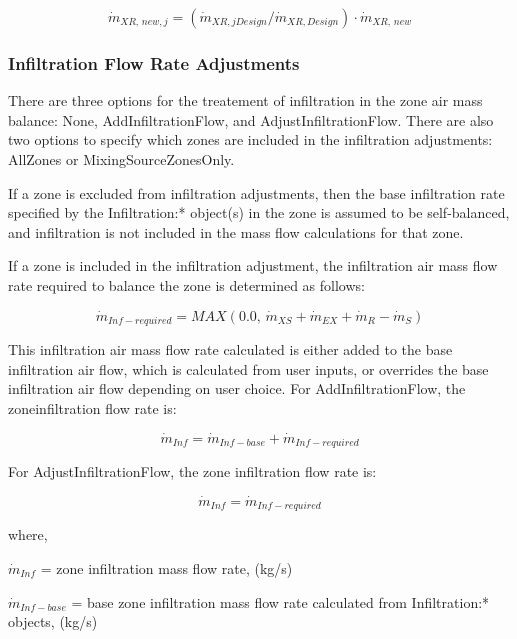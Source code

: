 \begin{equation}
{\dot m_{XR,\,new,j}} = \left( {{{\dot m}_{XR,jDesign}}/{{\dot m}_{XR,Design}}} \right) \cdot {\dot m_{XR,\,new}}
\end{equation}

\subsubsection{Infiltration Flow Rate Adjustments}\label{infiltration-flow-rate-adjustments}

There are three options for the treatement of infiltration in the zone air mass balance: None, AddInfiltrationFlow, and AdjustInfiltrationFlow. There are also two options to specify which zones are included in the infiltration adjustments: AllZones or MixingSourceZonesOnly.

If a zone is excluded from infiltration adjustments, then the base infiltration rate specified by the Infiltration:* object(s) in the zone is assumed to be self-balanced, and infiltration is not included in the mass flow calculations for that zone.

If a zone is included in the infiltration adjustment, the infiltration air mass flow rate required to balance the zone is determined as follows:

\begin{equation}
{\dot m_{Inf-required}} = MAX\left( {0.0,\,{{\dot m}_{XS}} + {{\dot m}_{EX}} + {{\dot m}_{R}} - {{\dot m}_S}} \right)
\end{equation}

This infiltration air mass flow rate calculated is either added to the base infiltration air flow, which is calculated from user inputs, or overrides the base infiltration air flow depending on user choice. For AddInfiltrationFlow, the zoneinfiltration flow rate is:

\begin{equation}
{\dot m_{Inf}} = {\dot m_{Inf-base}} + {\dot m_{Inf-required}}
\end{equation}

For AdjustInfiltrationFlow, the zone infiltration flow rate is:

\begin{equation}
{\dot m_{Inf}} = {\dot m_{Inf-required}}
\end{equation}

where,

\({\dot m_{Inf}}\) = zone infiltration mass flow rate, (kg/s)

\({\dot m_{Inf-base}}\) = base zone infiltration mass flow rate calculated from Infiltration:* objects, (kg/s)

